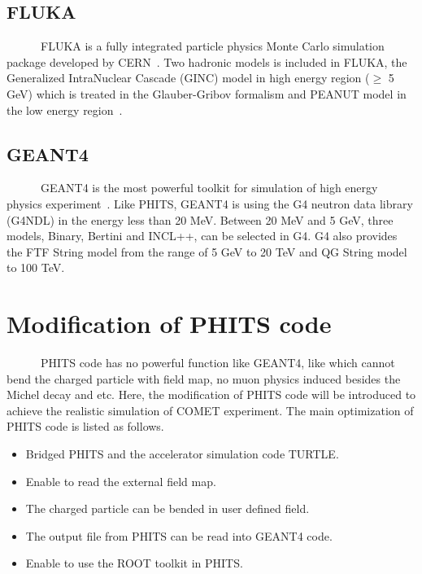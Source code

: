   \subsection{FLUKA}
~~~~~~FLUKA is a fully integrated particle physics Monte Carlo simulation package developed by CERN~\cite{fluka}.
Two hadronic models is included in FLUKA, the Generalized IntraNuclear Cascade (GINC) model in high energy region ($\ge$ 5 GeV) which is treated in the Glauber-Gribov formalism and PEANUT model in the low energy region~\cite{fluka2}.

  \subsection{GEANT4}
~~~~~~GEANT4 is the most powerful toolkit for simulation of high energy physics experiment~\cite{geant4}.
Like PHITS, GEANT4 is using the G4 neutron data library (G4NDL) in the energy less than 20 MeV.
Between 20 MeV and 5 GeV, three models, Binary, Bertini and INCL++, can be selected in G4.
G4 also provides the FTF String model from the range of 5 GeV to 20 TeV and QG String model to 100 TeV.

 \section{Modification of PHITS code}
~~~~~~PHITS code has no powerful function like GEANT4, like which cannot bend the charged particle with field map, no muon physics induced besides the Michel decay and etc.
Here, the modification of PHITS code will be introduced to achieve the realistic simulation of COMET experiment.
The main optimization of PHITS code is listed as follows.
\begin{itemize}
 \setlength{\itemsep}{-5pt}
 \item Bridged PHITS and the accelerator simulation code TURTLE.
 \item Enable to read the external field map.
 \item The charged particle can be bended in user defined field.
 \item The output file from PHITS can be read into GEANT4 code.
 \item Enable to use the ROOT toolkit in PHITS.
\end{itemize}

